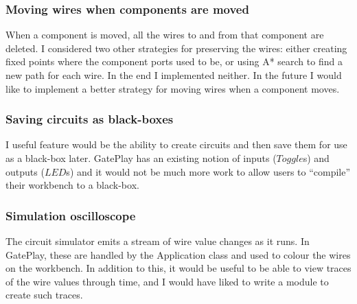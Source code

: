 \subsubsection{Moving wires when components are moved}
When a component is moved, all the wires to and from that component are deleted. I considered two other strategies for preserving the wires: either creating fixed points where the component ports used to be, or using A* search to find a new path for each wire. In the end I implemented neither. In the future I would like to implement a better strategy for moving wires when a component moves. 

\subsubsection{Saving circuits as black-boxes}
I useful feature would be the ability to create circuits and then save them for use as a black-box later. GatePlay has an existing notion of inputs ($Toggle$s) and outputs ($LED$s) and it would not be much more work to allow users to ``compile'' their workbench to a black-box.

\subsubsection{Simulation oscilloscope}
The circuit simulator emits a stream of wire value changes as it runs. In GatePlay, these are handled by the Application class and used to colour the wires on the workbench. In addition to this, it would be useful to be able to view traces of the wire values through time, and I would have liked to write a module to create such traces.